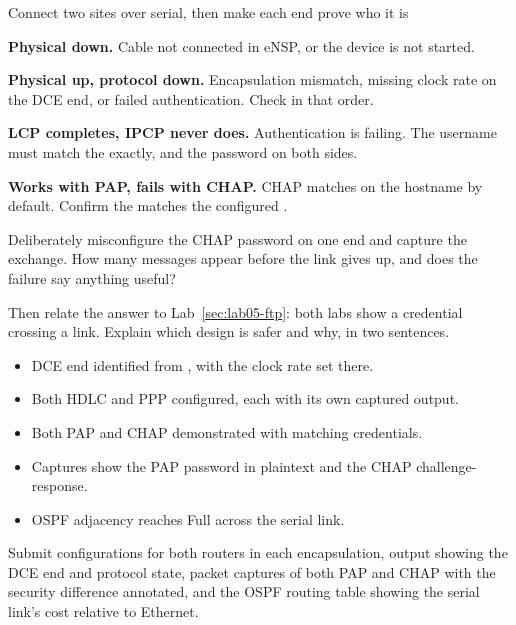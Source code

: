 \begin{labproject}{Connect two sites over serial, then make each end prove who it is}
\begin{troubleshoot}
\textbf{Physical down.} Cable not connected in eNSP, or the device is not started.

\textbf{Physical up, protocol down.} Encapsulation mismatch, missing clock rate on the DCE end, or failed authentication. Check in that order.

\textbf{LCP completes, IPCP never does.} Authentication is failing. The username must match the  exactly, and the password on both sides.

\textbf{Works with PAP, fails with CHAP.} CHAP matches on the hostname by default. Confirm the  matches the configured .
\end{troubleshoot}

\begin{tryit}
Deliberately misconfigure the CHAP password on one end and capture the exchange. How many messages appear before the link gives up, and does the failure say anything useful?

Then relate the answer to Lab~\ref{sec:lab05-ftp}: both labs show a credential crossing a link. Explain which design is safer and why, in two sentences.
\end{tryit}
\end{labproject}

\begin{verifybox}
\begin{itemize}
  \item DCE end identified from , with the clock rate set there.
  \item Both HDLC and PPP configured, each with its own captured output.
  \item Both PAP and CHAP demonstrated with matching credentials.
  \item Captures show the PAP password in plaintext and the CHAP challenge-response.
  \item OSPF adjacency reaches Full across the serial link.
\end{itemize}
\end{verifybox}

\begin{labdeliverable}
Submit configurations for both routers in each encapsulation,  output showing the DCE end and protocol state, packet captures of both PAP and CHAP with the security difference annotated, and the OSPF routing table showing the serial link's cost relative to Ethernet.
\end{labdeliverable}
